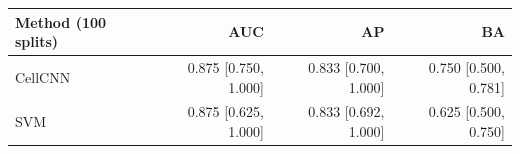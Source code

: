 \begin{tabular}{lrrr}
\toprule
Method (100 splits) & AUC & AP & BA \\
\midrule
CellCNN & 0.875 [0.750, 1.000] & 0.833 [0.700, 1.000] & 0.750 [0.500, 0.781] \\
SVM & 0.875 [0.625, 1.000] & 0.833 [0.692, 1.000] & 0.625 [0.500, 0.750] \\
\bottomrule
\end{tabular}

